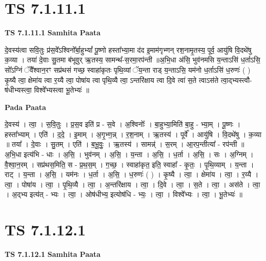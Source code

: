 \documentclass[17pt]{extarticle}
\begin{document}
\section*{ TS 7.1.11.1 }

\textbf{TS 7.1.11.1 } \newline
\textbf{Samhita Paata} \newline

दे॒वस्य॑त्वा सवि॒तुः प्र॑स॒वे᳚ऽश्विनो᳚र्बा॒हुभ्यां᳚ पू॒ष्णो हस्ता᳚भ्या॒मा द॑द इ॒माम॑गृभ्णन् रश॒नामृ॒तस्य॒ पूर्व॒ आयु॑षि वि॒दथे॑षु क॒व्या । तया॑ दे॒वाः सु॒तमा ब॑भूवुर् ऋ॒तस्य॒ सामन्थ᳚-स॒रमा॒रप॑न्ती ॥अ॒भि॒धा अ॑सि॒ भुव॑नमसि य॒न्ताऽसि॑ ध॒र्ताऽसि॒ सो᳚ऽग्निं ॅवै᳚श्वान॒रꣳ सप्र॑थसं गच्छ॒ स्वाहा॑कृतः पृथि॒व्यां ॅय॒न्ता राड् य॒न्ताऽसि॒ यम॑नो ध॒र्ताऽसि॑ ध॒रुणः॑ ( ) कृ॒ष्यै त्वा॒ क्षेमा॑य त्वा र॒य्यै त्वा॒ पोषा॑य त्वा पृथि॒व्यै त्वा॒ ऽन्तरि॑क्षाय त्वा दि॒वे त्वा॑ स॒ते त्वाऽस॑ते त्वा॒द्भ्यस्त्वौ-ष॑धीभ्यस्त्वा॒ विश्वे᳚भ्यस्त्वा भू॒तेभ्यः॑ ॥ \newline

\textbf{Pada Paata} \newline

दे॒वस्य॑ । त्वा॒ । स॒वि॒तुः । प्र॒स॒व इति॑ प्र - स॒वे । अ॒श्विनोः᳚ । बा॒हुभ्या॒मिति॑ बा॒हु - भ्या॒म् । पू॒ष्णः । हस्ता᳚भ्याम् । एति॑ । द॒दे॒ । इ॒माम् । अ॒गृ॒भ्ण॒न्न् । र॒श॒नाम् । ऋ॒तस्य॑ । पूर्वे᳚ । आयु॑षि । वि॒दथे॑षु । क॒व्या ॥ तया᳚ । दे॒वाः । सु॒तम् । एति॑ । ब॒भू॒वुः॒ । ऋ॒तस्य॑ । सामन्न्॑ । स॒रम् । आ॒रप॒न्तीत्या᳚ - रप॑न्ती ॥ अ॒भि॒धा इत्य॑भि - धाः । अ॒सि॒ । भुव॑नम् । अ॒सि॒ । य॒न्ता । अ॒सि॒ । ध॒र्ता । अ॒सि॒ । सः । अ॒ग्निम् । वै॒श्वा॒न॒रम् । सप्र॑थस॒मिति॒ स - प्र॒थ॒स॒म् । ग॒च्छ॒ । स्वाहा॑कृत॒ इति॒ स्वाहा᳚ - कृ॒तः॒ । पृ॒थि॒व्याम् । य॒न्ता । राट् । य॒न्ता । अ॒सि॒ । यम॑नः । ध॒र्ता । अ॒सि॒ । ध॒रुणः॑ ( ) । कृ॒ष्यै । त्वा॒ । क्षेमा॑य । त्वा॒ । र॒य्यै । त्वा॒ । पोषा॑य । त्वा॒ । पृ॒थि॒व्यै । त्वा॒ । अ॒न्तरि॑क्षाय । त्वा॒ । दि॒वे । त्वा॒ । स॒ते । त्वा॒ । अस॑ते । त्वा॒ । अ॒द्भ्य इत्य॑त् - भ्यः । त्वा॒ । ओष॑धीभ्य॒ इत्योष॑धि - भ्यः॒ । त्वा॒ । विश्वे᳚भ्यः । त्वा॒ । भू॒तेभ्यः॑ ॥  \newline




\section*{ TS 7.1.12.1 }

\textbf{TS 7.1.12.1 } \newline
\textbf{Samhita Paata} \newline
\end{document}
